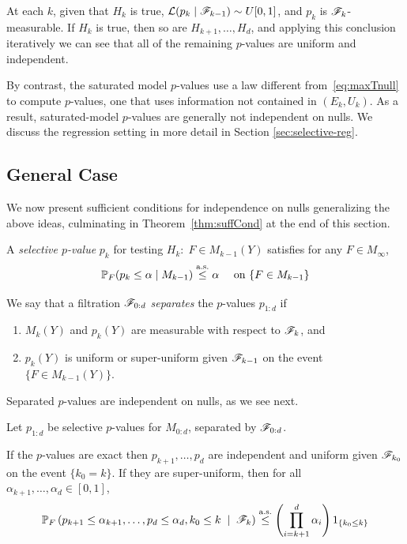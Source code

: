 \documentclass{article}
\begin{document}
At each $k$, given that $H_k$ is true, $\mathcal{L}(p_k \mid \mathscr{F}_{k-1})\sim U[0,1]$, and $p_k$ is $\mathscr{F}_k$-measurable. If $H_k$ is true, then so are $H_{k+1},\ldots, H_d$, and applying this conclusion iteratively we can see that all of the remaining $p$-values are uniform and independent.

By contrast, the saturated model $p$-values use a law different from~\eqref{eq:maxTnull} to compute $p$-values, one that uses
information not contained in $(E_k,U_k)$. As a result, saturated-model $p$-values are generally not independent on nulls. We discuss the regression setting in more detail in Section \ref{sec:selective-reg}.

\subsection{General Case}

We now present sufficient conditions for independence on nulls generalizing the above ideas, culminating in Theorem~\ref{thm:suffCond} at the end of this section.

A {\em selective $p$-value} $p_k$ for testing $H_k:\; F \in M_{k-1}(Y)$ satisfies for any $F\in M_{\infty}$,
\[
\mathbb{P}_F(p_k \leq \alpha \mid M_{k-1}) \overset{\textrm{a.s.}}{\leq} \alpha \quad \text{ on } \{F\in M_{k-1}\}
\]

We say that a filtration $\mathscr{F}_{0:d}$ {\em separates} the $p$-values $p_{1:d}$ if
\begin{enumerate}
\item $M_k(Y)$ and $p_k(Y)$ are measurable with respect to $\mathscr{F}_k$, and 
\item $p_k(Y)$ is uniform or super-uniform given $\mathscr{F}_{k-1}$ on the event $\{F\in M_{k-1}(Y)\}$.
\end{enumerate}
Separated $p$-values are independent on nulls, as we see next.

\begin{proposition}\label{prop:jointConserv}

  Let $p_{1:d}$ be selective $p$-values for $M_{0:d}$, 
  separated by $\mathscr{F}_{0:d}$.

  If the $p$-values are exact then $p_{k+1}, \ldots, p_d$ are
  independent and uniform given $\mathscr{F}_{k_0}$ on the event $\{k_0=k\}$.
  If they are super-uniform, then for all
  $\alpha_{k+1},\ldots,\alpha_d \in [0,1]$,
  \begin{equation}\label{eq:jointConserv}
  \mathbb{P}_F\left(p_{k+1}\leq \alpha_{k+1}, \ldots, p_d \leq \alpha_d, k_0 \leq k \;
    \mid\; \mathscr{F}_k\right) \overset{\textrm{a.s.}}{\leq} \left(\prod_{i=k+1}^d
  \alpha_i\right) 1_{\{k_0 \leq k\}}
  \end{equation}
\end{proposition}
\end{document}
